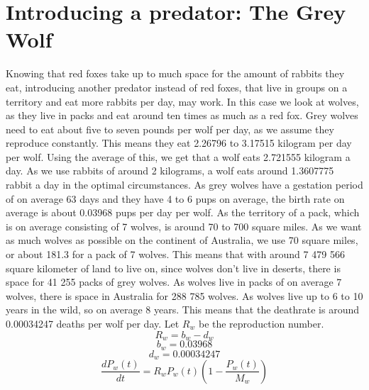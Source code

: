 \documentclass{article}
\begin{document}
\section{Introducing a predator: The Grey Wolf}
Knowing that red foxes take up to much space for the amount of rabbits they eat, introducing another predator instead of red foxes, that live in groups on a territory and eat more rabbits per day, may work. In this case we look at wolves, as they live in packs and eat around ten times as much as a red fox. Grey wolves need to eat about five to seven pounds per wolf per day, as we assume they reproduce constantly.\cite{WolfFood} This means they eat 2.26796 to 3.17515 kilogram per day per wolf. Using the average of this, we get that a wolf eats 2.721555 kilogram a day. As we use rabbits of around 2 kilograms, a wolf eats around 1.3607775 rabbit a day in the optimal circumstances. As grey wolves have a gestation period of on average 63 days  and they have 4 to 6 pups on average, the birth rate on average is about 0.03968 pups per day per wolf.\cite{WolfRepLifeTer} As the territory of a pack, which is on average consisting of 7 wolves, is around 70 to 700 square miles.\cite{WolfRepLifeTer} As we want as much wolves as possible on the continent of Australia, we use 70 square miles, or about 181.3 for a pack of 7 wolves. This means that with around 7 479 566 square kilometer of land to live on, since wolves don't live in deserts, there is space for 41 255 packs of grey wolves. As wolves live in packs of on average 7 wolves, there is space in Australia for 288 785 wolves.\cite{WolfRepLifeTer} As wolves live up to 6 to 10 years in the wild, so on average 8 years.\cite{WolfRepLifeTer} This means that the deathrate is around 0.00034247 deaths per wolf per day. 
Let $R_w$ be the reproduction number.
$$R_w = b_w - d_w$$
$$b_w = 0.03968$$
$$d_w = 0.00034247$$
$$\frac{dP_w(t)}{dt} = R_wP_w(t)(1-\frac{P_w(t)}{M_w})$$
\end{document}
